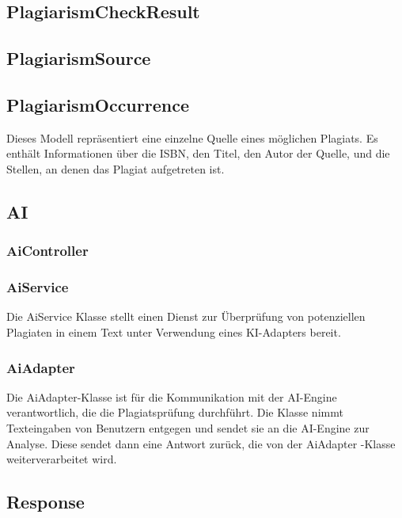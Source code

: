 \subsection{PlagiarismCheckResult}\label{subsec:plagiarism_check_result}

\subsection{PlagiarismSource}\label{subsec:plagiarism_source}

\subsection{PlagiarismOccurrence}\label{subsec:plagiarism_occurrence}
Dieses Modell repräsentiert eine einzelne Quelle eines möglichen Plagiats.
Es enthält Informationen über die ISBN, den Titel,
den Autor der Quelle, und die Stellen, an denen das Plagiat aufgetreten ist.

\subsection{AI}\label{subsec:ai}

\subsubsection{AiController}\label{subsubsec:ai_controller}

\subsubsection{AiService}\label{subsubsec:ai_service}
Die AiService Klasse stellt einen Dienst zur Überprüfung von potenziellen Plagiaten in einem Text unter Verwendung eines KI-Adapters bereit.

\subsubsection{AiAdapter}\label{subsubsec:ai_adapter}
Die AiAdapter-Klasse ist für die Kommunikation mit der AI-Engine verantwortlich, die die Plagiatsprüfung durchführt.
Die Klasse nimmt Texteingaben von Benutzern entgegen und sendet sie an die AI-Engine zur Analyse.
Diese sendet dann eine Antwort zurück, die von der AiAdapter -Klasse weiterverarbeitet wird.

\subsection{Response}\label{subsec:response}

